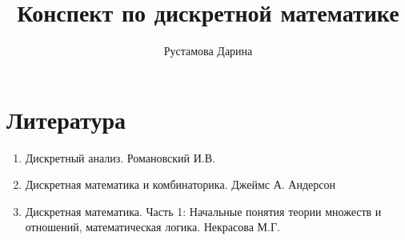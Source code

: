 \documentclass[12pt]{report}
\title{
    Конспект по дискретной математике \\ 
}
\author{
    Рустамова Дарина
}
\date{\the\year}
\begin{document}
\maketitle
\tableofcontents

\newcommand\shortlorem{}

\newpage













\chapter*{Литература}   
\begin{enumerate}
    \item Дискретный анализ. Романовский И.В.
    \item Дискретная математика и комбинаторика. Джеймс А. Андерсон
    \item Дискретная математика. Часть 1: Начальные понятия теории множеств и отношений,
    математическая логика. Некрасова М.Г.
\end{enumerate}

\shortlorem
\end{document}
